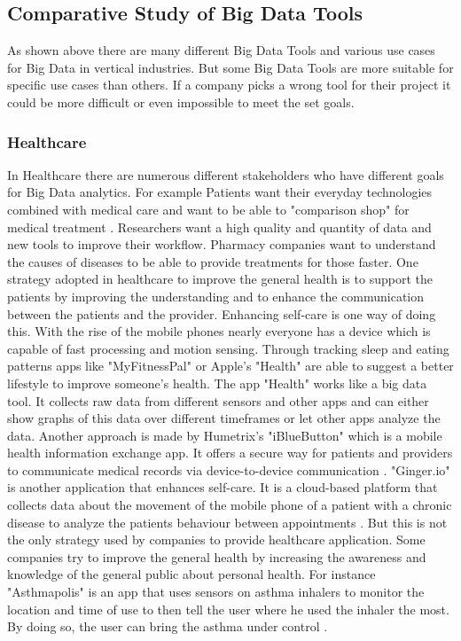 \documentclass[runningheads]{llncs}
\begin{document}
\subsection{Comparative Study of Big Data Tools}
As shown above there are many different Big Data Tools and various use cases for Big Data in vertical industries. But some Big Data Tools are more suitable for specific use cases than others. If a company picks a wrong tool for their project it could be more difficult or even impossible to meet the set goals.

\subsubsection{Healthcare}
In Healthcare there are numerous different stakeholders who have different goals for Big Data analytics. For example Patients want their everyday technologies combined with medical care and want to be able to "comparison shop" for medical treatment \cite{FELDMAN}. Researchers want a high quality and quantity of data and new tools to improve their workflow. Pharmacy companies want to understand the causes of diseases to be able to provide treatments for those faster.
One strategy adopted in healthcare to improve the general health is to support the patients by improving the understanding and to enhance the communication between the patients and the provider. Enhancing self-care is one way of doing this. With the rise of the mobile phones nearly everyone has a device which is capable of fast processing and motion sensing. Through tracking sleep and eating patterns apps like "MyFitnessPal" or Apple's "Health" are able to suggest a better lifestyle to improve someone's health. The app "Health" works like a big data tool. It collects raw data from different sensors and other apps and can either show graphs of this data over different timeframes or let other apps analyze the data. 
Another approach is made by Humetrix's "iBlueButton" which is a mobile health information exchange app. It offers a secure way for patients and providers to communicate medical records via device-to-device communication \cite{FELDMAN}. "Ginger.io" is another application that enhances self-care. It is a cloud-based platform that collects data about the movement of the mobile phone of a patient with a chronic disease to analyze the patients behaviour between appointments \cite{FELDMAN}. 
But this is not the only strategy used by companies to provide healthcare application. Some companies try to improve the general health by increasing the awareness and knowledge of the general public about personal health. For instance "Asthmapolis" is an app that uses sensors on asthma inhalers to monitor the location and time of use to then tell the user where he used the inhaler the most. By doing so, the user can bring the asthma under control \cite{FELDMAN}. 
\end{document}
